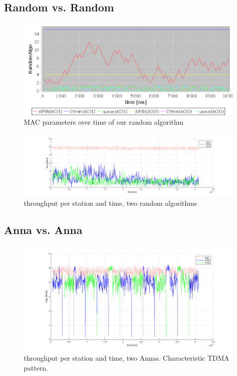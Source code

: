 \documentclass[12pt]{article}
\begin{document}
\subsection{Random vs. Random}
\begin{figure}[h!]
\centering
\includegraphics[width=\textwidth]{img/random_vs_random-50Mbps-PLOT.png}
\caption{MAC parameters over time of our random algorithm \label{plot:rr}}
\end{figure}

\begin{figure}[h!]
\centering
\includegraphics[width=\textwidth]{img/random_vs_random.png}
\caption{throughput per station and time, two random algorithms \label{fig:rr}}
\end{figure}

\subsection{Anna vs. Anna}

\begin{figure}[h!]
\centering
\includegraphics[width=\textwidth]{img/anna_vs_anna-5Mbps-TDMA.png}
\caption{throughput per station and time, two Annas. Characteristic TDMA pattern. \label{fig:aa}}
\end{figure}
\end{document}
